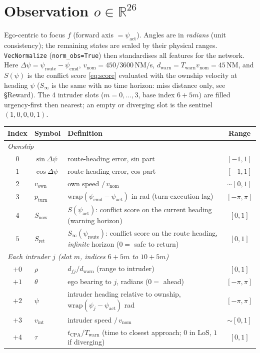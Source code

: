 \documentclass[11pt, a4paper]{article}
\begin{document}
\section{Observation $o\in\mathbb R^{26}$}
Ego-centric to focus $f$ (forward axis $=\psi_\text{act}$). Angles are in \emph{radians}
(unit consistency); the remaining states are scaled by their physical ranges.
\texttt{VecNormalize} (\texttt{norm\_obs=True}) then standardises all features for the network.
Here $\Delta\psi=\psi_\text{route}-\psi_\text{cmd}$,
$v_\text{nom}=450/3600$\,NM/s, $d_\text{warn}=T_\text{warn}v_\text{nom}=45$\,NM, and
$S(\psi)$ is the conflict score \eqref{eq:score} evaluated with the ownship velocity at heading $\psi$
($S_\infty$ is the same with no time horizon: miss distance only, see \S Reward).
The 4 intruder slots ($m=0,\dots,3$, base index $6+5m$) are filled urgency-first then nearest;
an empty or diverging slot is the sentinel $(1,0,0,0,1)$.
\begin{table}[h]\centering
\begin{tabular}{cllc}
\toprule
Index & Symbol & Definition & Range\\
\midrule
\multicolumn{4}{l}{\emph{Ownship}}\\
$0$ & $\sin\Delta\psi$ & route-heading error, sin part & $[-1,1]$\\
$1$ & $\cos\Delta\psi$ & route-heading error, cos part & $[-1,1]$\\
$2$ & $v_\text{own}$ & own speed $/\,v_\text{nom}$ & ${\sim}[0,1]$\\
$3$ & $p_\text{turn}$ & $\mathrm{wrap}(\psi_\text{cmd}-\psi_\text{act})$ in rad (turn-execution lag) & $[-\pi,\pi]$\\
$4$ & $S_\text{now}$ & $S(\psi_\text{act})$: conflict score on the current heading (warning horizon) & $[0,1]$\\
$5$ & $S_\text{ret}$ & $S_\infty(\psi_\text{route})$: conflict score on the route heading, \emph{infinite} horizon ($0=$ safe to return) & $[0,1]$\\
\multicolumn{4}{l}{\emph{Each intruder $j$ (slot $m$, indices $6{+}5m$ to $10{+}5m$)}}\\
$+0$ & $\rho$ & $d_{fj}/d_\text{warn}$ (range to intruder) & $[0,1]$\\
$+1$ & $\theta$ & ego bearing to $j$, radians ($0=$ ahead) & $[-\pi,\pi]$\\
$+2$ & $\psi$ & intruder heading relative to ownship, $\mathrm{wrap}(\psi_j-\psi_\text{act})$ rad & $[-\pi,\pi]$\\
$+3$ & $v_\text{int}$ & intruder speed $/\,v_\text{nom}$ & ${\sim}[0,1]$\\
$+4$ & $\tau$ & $t_\text{CPA}/T_\text{warn}$ (time to closest approach; $0$ in LoS, $1$ if diverging) & $[0,1]$\\
\bottomrule
\end{tabular}
\end{table}
\end{document}
